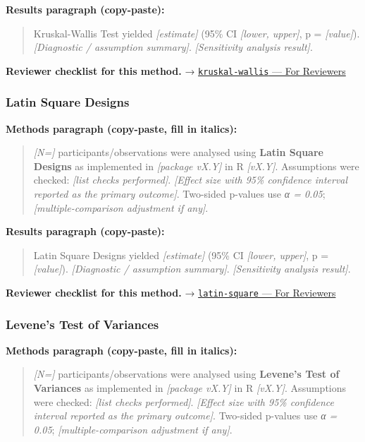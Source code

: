 \documentclass[
]{article}
\begin{document}
\textbf{Results paragraph (copy-paste):}

\begin{quote}
Kruskal-Wallis Test yielded \emph{{[}estimate{]}} (95\% CI
\emph{{[}lower, upper{]}}, p = \emph{{[}value{]}}). \emph{{[}Diagnostic
/ assumption summary{]}}. \emph{{[}Sensitivity analysis result{]}}.
\end{quote}

\textbf{Reviewer checklist for this method.} →
\href{../chapters/04-inferential/kruskal-wallis.Rmd\#for-reviewers}{\texttt{kruskal-wallis}
--- For Reviewers}

\subsubsection{Latin Square Designs}\label{latin-square-designs}

\textbf{Methods paragraph (copy-paste, fill in italics):}

\begin{quote}
\emph{{[}N={]}} participants/observations were analysed using
\textbf{Latin Square Designs} as implemented in \emph{{[}package
vX.Y{]}} in R \emph{{[}vX.Y{]}}. Assumptions were checked: \emph{{[}list
checks performed{]}}. \emph{{[}Effect size with 95\% confidence interval
reported as the primary outcome{]}}. Two-sided p-values use \emph{α =
0.05}; \emph{{[}multiple-comparison adjustment if any{]}}.
\end{quote}

\textbf{Results paragraph (copy-paste):}

\begin{quote}
Latin Square Designs yielded \emph{{[}estimate{]}} (95\% CI
\emph{{[}lower, upper{]}}, p = \emph{{[}value{]}}). \emph{{[}Diagnostic
/ assumption summary{]}}. \emph{{[}Sensitivity analysis result{]}}.
\end{quote}

\textbf{Reviewer checklist for this method.} →
\href{../chapters/16-design/latin-square.Rmd\#for-reviewers}{\texttt{latin-square}
--- For Reviewers}

\subsubsection{Levene's Test of
Variances}\label{levenes-test-of-variances}

\textbf{Methods paragraph (copy-paste, fill in italics):}

\begin{quote}
\emph{{[}N={]}} participants/observations were analysed using
\textbf{Levene's Test of Variances} as implemented in \emph{{[}package
vX.Y{]}} in R \emph{{[}vX.Y{]}}. Assumptions were checked: \emph{{[}list
checks performed{]}}. \emph{{[}Effect size with 95\% confidence interval
reported as the primary outcome{]}}. Two-sided p-values use \emph{α =
0.05}; \emph{{[}multiple-comparison adjustment if any{]}}.
\end{quote}
\end{document}
